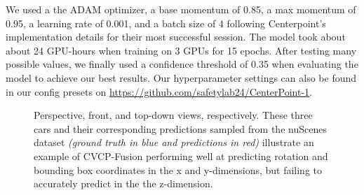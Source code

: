 \documentclass[a4paper,12pt]{article}
\begin{document}
\begin{multicols}{2}
We used a the ADAM optimizer, a base momentum of 0.85, a max momentum of 0.95, a learning rate of 0.001, and a batch size of 4 following Centerpoint's implementation details for their most successful session. The model took about about 24 GPU-hours when training on 3 GPUs for 15 epochs. After testing many possible values, we finally used a confidence threshold of 0.35 when evaluating the model to achieve our best results. Our hyperparameter settings can also be found in our config presets on \url{https://github.com/safetylab24/CenterPoint-1}.


\end{multicols}
\begin{figure}[t]
{%
\setlength{\fboxsep}{0pt}%
\setlength{\fboxrule}{1pt}%
  \centering
  \hspace*{.1in}
  \hspace*{.1in}
}%
\caption{Perspective, front, and top-down views, respectively. These three cars and their corresponding predictions sampled from the nuScenes dataset \textit{(ground truth in blue and predictions in red)} illustrate an example of CVCP-Fusion performing well at predicting rotation and bounding box coordinates in the x and y-dimensions, but failing to accurately predict in the the z-dimension.}
\label{predictionExample}
\end{figure}
\end{document}
